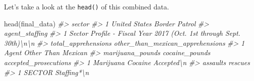 \documentclass[
  12pt,
  openany]{book}
\newenvironment{Shaded}{\begin{snugshade}}{\end{snugshade}}
\newcommand{\CommentTok}[1]{\textcolor[rgb]{0.37,0.37,0.37}{\textit{#1}}}
\newcommand{\FunctionTok}[1]{\textcolor[rgb]{0,0,0}{#1}}
\newcommand{\NormalTok}[1]{#1}
\begin{document}
Let's take a look at the \texttt{head()} of this combined data.

\begin{Shaded}
\begin{Highlighting}[]
\FunctionTok{head}\NormalTok{(final\_data)}
\CommentTok{\#\textgreater{}                        sector}
\CommentTok{\#\textgreater{} 1 United States Border Patrol}
\CommentTok{\#\textgreater{}                                                        agent\_staffing}
\CommentTok{\#\textgreater{} 1 Sector Profile {-} Fiscal Year 2017 (Oct. 1st through Sept. 30th)\textbackslash{}n\textbackslash{}n}
\CommentTok{\#\textgreater{}   total\_apprehensions other\_than\_mexican\_apprehensions}
\CommentTok{\#\textgreater{} 1               Agent               Other Than Mexican}
\CommentTok{\#\textgreater{}   marijuana\_pounds cocaine\_pounds accepted\_prosecutions}
\CommentTok{\#\textgreater{} 1        Marijuana        Cocaine            Accepted\textbackslash{}n}
\CommentTok{\#\textgreater{}   assaults     rescues}
\CommentTok{\#\textgreater{} 1   SECTOR Staffing*\textbackslash{}n}

\end{Highlighting}
\end{Shaded}
\end{document}
